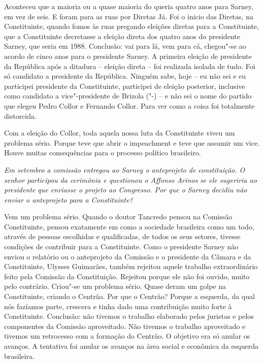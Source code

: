 Aconteceu que a maioria ou a quase maioria do  queria quatro anos
para Sarney, em vez de seis. E foram para as ruas por Diretas Já. Foi o
inicio das Diretas, na Constituinte, quando fomos às ruas pregando
eleições diretas para a Constituinte, que a Constituinte decretasse a
eleição direta dos quatro anos do presidente Sarney, que seria em 1988.
Conclusão: vai para lá, vem para cá, chegou"-se ao acordo de cinco anos
para o presidente Sarney. A primeira eleição de presidente da República
após a ditadura -- eleição direta -- foi realizada isolada de tudo. Foi
só candidato a presidente da República. Ninguém sabe, hoje -- eu não sei
e eu participei presidente da Constituinte, participei de eleição
posterior, inclusive como candidato a vice"-presidente de Brizola
("-) -- e não sei o nome do partido que elegeu Pedro Collor e
Fernando Collor. Para ver como a coisa foi totalmente distorcida.

Com a eleição do Collor, toda aquela nossa luta da Constituinte viveu um
problema sério. Porque teve que abrir o impeachment e teve que assumir
um vice. Houve muitas consequências para o processo político brasileiro.

\medskip

\noindent\emph{Em setembro a comissão entregou ao Sarney o anteprojeto de
constituição. O senhor participou da cerimônia e questionou o Affonso
Arinos se ele sugeriria ao presidente que enviasse o projeto ao
Congresso. Por que o Sarney decidiu não enviar o anteprojeto para a
Constituinte?}

Vem um problema sério. Quando o doutor Tancredo pensou na
Comissão Constituinte, pensou exatamente em como a sociedade brasileira
como um todo, através de pessoas escolhidas e qualificadas, de todos os
seus setores, tivesse condições de contribuir para a Constituinte. Como
o presidente Sarney não enviou o relatório ou o anteprojeto da Comissão
e o presidente da Câmara e da Constituinte, Ulysses Guimarães, também
rejeitou aquele trabalho extraordinário feito pela Comissão da
Constituição. Rejeitou porque ele não foi ouvido, muito pelo contrário.
Criou"-se um problema sério. Quase deram um golpe na Constituinte,
criando o Centrão. Por que o Centrão? Porque a esquerda, da qual nós
fazíamos parte, crescera e tinha dado uma contribuição muito forte à
Constituinte. Conclusão: não tivemos o trabalho elaborado pelos juristas
e pelos componentes da Comissão aproveitado. Não tivemos o trabalho
aproveitado e tivemos um retrocesso com a formação do Centrão. O
objetivo era só anular os avanços. A tentativa foi anular os avanços na
área social e econômica da esquerda brasileira.

